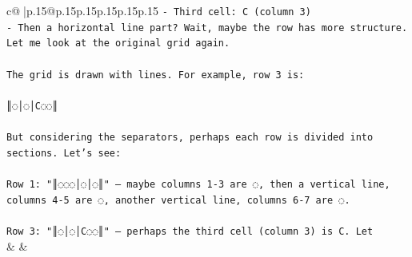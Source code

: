 \documentclass{article}
\begin{document}
{\begin{supertabular}{c@{$\;$}|p{.15\linewidth}@{}p{.15\linewidth}p{.15\linewidth}p{.15\linewidth}p{.15\linewidth}p{.15\linewidth}}
{{{\texttt{{-} Third cell: C (column 3)} \\
\texttt{{-} Then a horizontal line part? Wait, maybe the row has more structure. Let me look at the original grid again.} \\
\\ 
\texttt{The grid is drawn with lines. For example, row 3 is:} \\
\\ 
\texttt{║◌│◌│C◌◌║} \\
\\ 
\texttt{But considering the separators, perhaps each row is divided into sections. Let's see:} \\
\\ 
\texttt{Row 1: "║◌◌◌│◌│◌║" — maybe columns 1{-}3 are ◌, then a vertical line, columns 4{-}5 are ◌, another vertical line, columns 6{-}7 are ◌.} \\
\\ 
\texttt{Row 3: "║◌│◌│C◌◌║" — perhaps the third cell (column 3) is C. Let} \\
            }
        }
    }
    & & \\ \\


\end{supertabular}}
\end{document}
